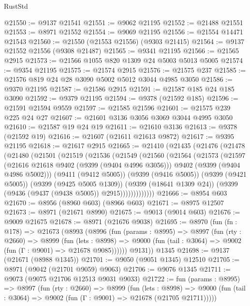 \begin{lexlean}{RustStd}
\begin{coremodule}
@21550 := @9137 @21541
@21551 := @9062 @21195
@21552 := @21488 @21551
@21553 := @8971 @21552
@21554 := @9069 @21195
@21556 := @21554 @14471 @21543
@21560 := @21550 (@21553 @21556) (@9303 @21415)
@21564 := @9137 @21552 @21556 (@9308 @21487)
@21565 := @9341 @21195
@21566 := @21565 @2915
@21573 := @21566 @1055 @820 @1309 @24 @5003 @5013 @5005
@21574 := @9354 @21195
@21575 := @21574 @2915
@21576 := @21575 @237
@21585 := @21576 @819 @24 @28 @3090 @5002 @5012 @3044 @4985 @3050
@21586 := @9370 @21195
@21587 := @21586 @2915
@21591 := @21587 @185 @24 @185 @3090
@21592 := @9379 @21195
@21594 := @9378 (@21592 @185)
@21596 := @21591 @21594 @9559
@21597 := @21585 @21596
@21601 := @21575 @239 @225 @24 @27
@21607 := @21601 @3136 @3056 @3069 @3044 @4995 @3050
@21610 := @21587 @19 @24 @19
@21611 := @21610 @3136
@21613 := @9378 (@21592 @19)
@21616 := @21607 (@21611 @21613 @9872)
@21617 := @9395 @21195
@21618 := @21617 @2915
@21665 := @21410
    (@21435
      (@21476
        (@21478
          (@21480
            (@21501
              (@21519
                (@21536
                  (@21549
                    (@21560
                      (@21564
                        (@21573
                          (@21597
                            (@21616 @21618 @9402 (@9399 (@9404 @4996 @3056)))
                            @9402
                            (@9399 (@9404 @4986 @5002)))
                          (@9411 (@9412 @5005))
                          (@9399 (@9416 @5005))
                          (@9399 (@9421 @5005))
                          (@9399 (@9425 @5005 @1309))
                          (@9399 (@18641 @1309 @24))
                          (@9399 (@9436 (@9437 (@9438 @5005)) @2915)))))))))))))
@21666 := @8954 @603
@21670 := @8956 (@8960 @603) (@8966 @603)
@21671 := @8975 @12507
@21673 := @8971 (@21671 @8990)
@21675 := @9013 (@9014 @603)
@21676 := @9009 @21675
@21678 := @8971 (@21676 @9038)
@21695 := @8970
    (fun (fn : @178) =>
    @21673
      (@8993
        (@8996
          (fun (params : @8995) =>
          @8997
            (fun (rty : @2660) =>
            @8999
              (fun (lets : @8998) =>
              @9000 (fun (tail : @3064) => @9002 (fun (Γ : @9001) => @21678 @9085))))))
        @9131))
    @1345
@21698 := @9137 (@21671 (@8988 @1345))
@21701 := @9050 (@9051 @1345) @12510
@21705 := @8971 (@9042 (@21701 @9059) @9063)
@21706 := @9076 @1345
@21711 := @9073 (@9075 @21706 @12513 @9031 @9033)
@21722 := fun (params : @8995) =>
  @8997
    (fun (rty : @2660) =>
    @8999
      (fun (lets : @8998) =>
      @9000 (fun (tail : @3064) => @9002 (fun (Γ : @9001) => @21678 (@21705 @21711)))))

\end{coremodule}
\end{lexlean}
